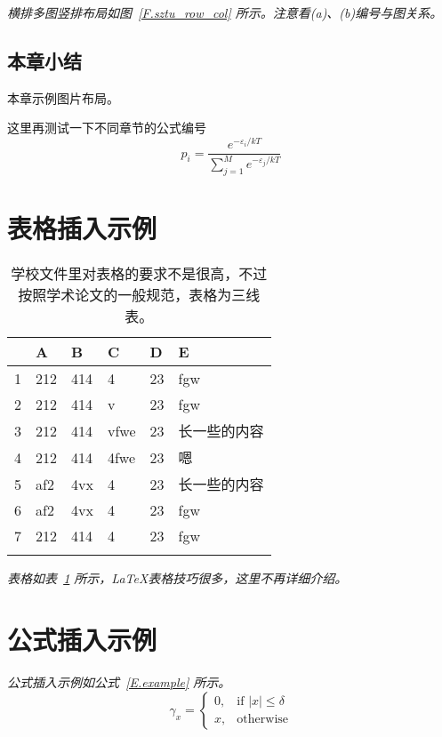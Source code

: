 \emph{横排多图竖排布局如图~\ref{F.sztu_row_col} 所示。注意看(a)、(b)编号与图关系。}

\subsection{本章小结}
本章示例图片布局。

这里再测试一下不同章节的公式编号
\begin{equation}
p_{i} = \frac{e^{-\varepsilon_{i}/kT}}{\sum_{j=1}^{M}e^{-\varepsilon_{j}/kT}}
\end{equation}

\newpage    %


\section{表格插入示例}

\begin{table}[htb]
  \centering
  \caption{学校文件里对表格的要求不是很高，不过按照学术论文的一般规范，表格为三线表。}
  \label{T.example}
  \begin{tabular}{llllll}
  \hline
   & A  & B  & C  & D  & E \\
  \hline
1 	& 212 & 414 & 4 		& 23 & fgw	\\
2 	& 212 & 414 & v 		& 23 & fgw	\\
3 	& 212 & 414 & vfwe		& 23 & 长一些的内容	\\
4 	& 212 & 414 & 4fwe		& 23 & 嗯	\\
5 	& af2 & 4vx & 4 		& 23 & 长一些的内容	\\
6 	& af2 & 4vx & 4 		& 23 & fgw	\\
7 	& 212 & 414 & 4 		& 23 & fgw	\\

\hline{}
\end{tabular}
\end{table}

\emph{表格如表~\ref{T.example} 所示，\LaTeX 表格技巧很多，这里不再详细介绍。}

\lipsum

\newpage    %

\section{公式插入示例}

\lipsum

\emph{公式插入示例如公式~\eqref{E.example} 所示。}
\begin{equation}
\gamma_x=
\begin{cases}
  0, & \text{if $|x| \leq \delta$} \\
  x, & \text{otherwise}
\end{cases}
\label{E.example}
\end{equation}


